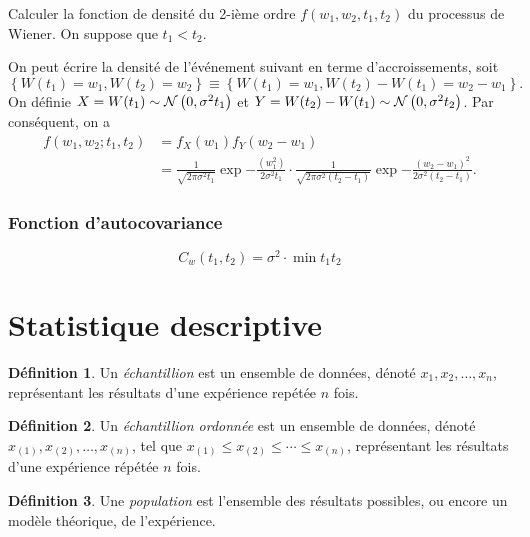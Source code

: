 \documentclass[11pt]{article}
\makeatletter
\newcommand\Norm[2]{%
	\ensuremath{%
		\mathcal{N}\left(#1,#2\right)%
	}%
}%
\theoremstyle{remark}
\theoremstyle{definition}
\newtheorem*{@definition}{Définition}
\newenvironment{definition}{%
	\begin{@definition}%
}{%
	\end{@definition}%
	\setcounter{property}{0}%
}
\makeatother
\begin{document}
\begin{exemple}
	Calculer la fonction de densité du 2-ième ordre $f(w_1,w_2,t_1,t_2)$ du
	processus de Wiener. On suppose que $t_1<t_2$.

	On peut écrire la densité de l'événement suivant en terme d'accroissements,
	soit
	\begin{equation*}
		\left\{W(t_1)=w_1,W(t_2)=w_2\right\}
		\equiv\left\{W(t_1)=w_1,W(t_2)-W(t_1)=w_2-w_1\right\}.
	\end{equation*}
	On définie $X=W(t_1)\sim\Norm{0}{\sigma^2t_1}$ et $Y=W(t_2)-W(t_1)\sim
	\Norm{0}{\sigma^2t_2}$. Par conséquent, on a
	\begin{equation*}
		\begin{split}
			f(w_1,w_2;t_1,t_2)
			&=f_X(w_1)f_Y(w_2-w_1)\\
			&=\frac{1}{\sqrt{2\pi\sigma^2t_1}}\exp{-
				\frac{(w_1^2)}{2\sigma^2t_1}
			}\cdot\frac{1}{\sqrt{2\pi\sigma^2(t_2-t_1)}}\exp{-
				\frac{(w_2-w_1)^2}{2\sigma^2(t_2-t_1)}
			}.
		\end{split}
	\end{equation*}
\end{exemple}

\subsubsection{Fonction d'autocovariance}
\begin{equation*}
	C_w(t_1,t_2)=\sigma^2\cdot\min{t_1}{t_2}
\end{equation*}

\section{Statistique descriptive}
\begin{definition}
	Un \textit{échantillion} est un ensemble de données, dénoté $x_1,x_2,\dots,
	x_n$, représentant les résultats d'une expérience repétée $n$ fois.
\end{definition}

\begin{definition}
	Un \textit{échantillion ordonnée} est un ensemble de données, dénoté
	$x_{(1)},x_{(2)},\dots,x_{(n)}$, tel que $x_{(1)}\leq x_{(2)}\leq\cdots\leq
	x_{(n)}$, représentant les résultats d'une expérience répétée $n$ fois.
\end{definition}

\begin{definition}
	Une \textit{population} est l'ensemble des résultats possibles, ou encore
	un modèle théorique, de l'expérience.
\end{definition}
\end{document}
